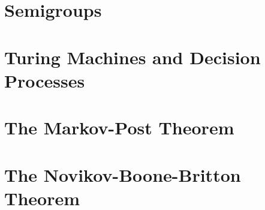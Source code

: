 \documentclass[12pt]{article}
\theoremstyle{definition}
\numberwithin{equation}{theorem}
\begin{document}
\section{Semigroups}
\section{Turing Machines and Decision Processes}
\section{The Markov-Post Theorem}
\section{The Novikov-Boone-Britton Theorem}
\nocite{rotman1999introduction}



\end{document}
